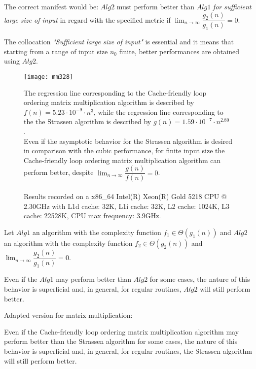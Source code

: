 The correct manifest would be: $Alg2$ must perform better than $Alg1$ \textit{for sufficient large size of input} in regard with the specified metric if $\lim_{n\to\infty} \dfrac{g_2(n)}{g_1(n)} = 0$. 

The collocation
 \textit{"Sufficient large size of input"} is essential and it means that starting from a range of input size $n_{0}$ finite, better performances are obtained using $Alg2$.


\begin{figure}[H]
\centering
\texttt{[image: mm328]}
\caption{The regression line corresponding to the Cache-friendly loop ordering matrix multiplication algorithm is described by $f(n) = 5.23 \cdot 10^{-9} \cdot n^{3} $, while the regression line corresponding to the the Strassen algorithm is described by $g(n) = 1.59 \cdot 10^{-7} \cdot n^{2.80} $ . \\  Even if the asymptotic behavior for the Strassen algorithm is desired in comparison with the cubic performance, for finite input size the Cache-friendly loop ordering matrix multiplication algorithm can perform better, despite $\lim_{n\to\infty} \dfrac{g(n)}{f(n)} = 0$.  \\ \\ Results recorded on a x86\_64 Intel(R) Xeon(R) Gold 5218 CPU @ 2.30GHz with L1d cache: 32K, L1i cache: 32K, L2 cache: 1024K, L3 cache: 22528K, CPU max frequency: 3.9GHz.}
\end{figure}


\begin{pitfall}
Let $Alg1$ an algorithm with the complexity function $f_{1} \in \Theta(g_1(n))$  and $Alg2$ an algorithm with the complexity function $f_{2} \in \Theta(g_2(n))$ and $\lim_{n\to\infty} \dfrac{g_2(n)}{g_1(n)} = 0$.

Even if the $Alg1$ may perform better than $Alg2$ for some cases, the nature of this behavior is superficial and, in general, for regular routines, $Alg2$ will still perform better.
\end{pitfall}

\begin{pitfall}
Adapted version for matrix multiplication: 

Even if the Cache-friendly loop ordering matrix multiplication algorithm may perform better than the Strassen algorithm for some cases, the nature of this behavior is superficial and, in general, for regular routines, the Strassen algorithm will still perform better.
\end{pitfall}

